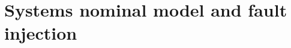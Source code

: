 \documentclass[12pt,openright,twoside,a4paper,oldfontcommands,english,brazil,final]{abntex2}
\theoremstyle{theo}
\newcommand{\includegraphicsaspectratio}[2][1]{%
  \texttt{[image: \#2]}%
}
\newcommand{\parsin}[1]{\ensuremath\left( #1 \right)}
\begin{document}





\section{Systems nominal model and fault injection}
\label{sec:faults-injection}
\end{document}
